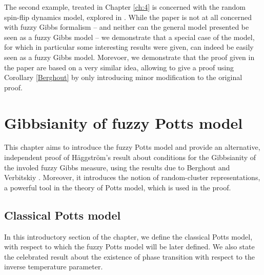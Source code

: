 \documentclass[12pt]{article}
\newcommand{\1}{\mathbbm{1}}
\newcommand{\5}{\vspace{0.5cm}}
\theoremstyle{definition}
\begin{document}
The second example, treated in Chapter \ref{ch:4} is concerned with the random spin-flip dynamics model, explored in \cite{EFHR}. While the paper is not at all concerned with fuzzy Gibbs formalism -- and neither can the general model presented be seen as a fuzzy Gibbs model -- we demonstrate that a special case of the model, for which in particular some interesting results were given, can indeed be easily seen as a fuzzy Gibbs model. Morevoer, we demonstrate that the proof given in the paper are based on a very similar idea, allowing to give a proof using Corollary \ref{Berghout} by only introducing minor modification to the original proof.


\pagebreak


\section{Gibbsianity of fuzzy Potts model}\label{ch:3}

This chapter aims to introduce the fuzzy Potts model and provide an alternative, independent proof of H\"aggstr\"om's result \cite{Hag} about conditions for the Gibbsianity of the involed fuzzy Gibbs measure, using the results due to Berghout and Verbitskiy \cite{Ber}. Moreover, it introduces the notion of random-cluster representations, a powerful tool in the theory of Potts model, which is used in the proof.


\subsection{Classical Potts model}

In this introductory section of the chapter, we define the classical Potts model, with respect to which the fuzzy Potts model will be later defined. We also state the celebrated result about the existence of phase transition with respect to the inverse temperature parameter. \\
\end{document}
